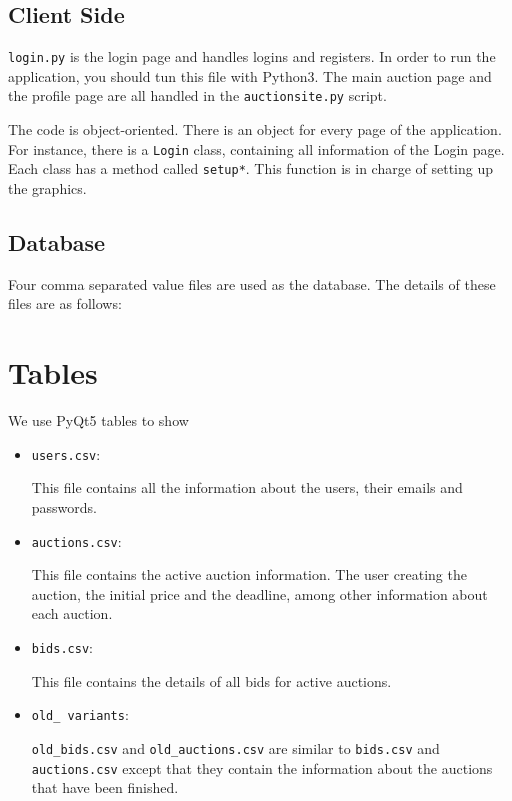\documentclass{article}
\begin{document}
\subsection{Client Side}

\texttt{login.py} is the login page and handles logins and registers. In order to run the application, you should tun this file with Python3. The main auction page and the profile page are all handled in the 
\texttt{auctionsite.py} script.

The code is object-oriented. There is an object for every page of the application. For instance, there is a \texttt{Login} class, containing all information of the Login page. Each class has a method called \texttt{setup*}. This function is in charge of setting up the graphics.

\subsection{Database}
Four comma separated value files are used as the database. The details of these files are as follows:

\section{Tables}

We use PyQt5 tables to show


\begin{itemize}
\item
\texttt{users.csv}:

This file contains all the information about the users, their emails and passwords.

\item 
\texttt{auctions.csv}:

This file contains the active auction information. The user creating the auction, the initial price and the deadline, among other information about each auction.

\item 
\texttt{bids.csv}:

This file contains the details of all bids for active auctions.


\item 
\texttt{old\_ variants}:

\texttt{old\_bids.csv} and \texttt{old\_auctions.csv}
are similar to \texttt{bids.csv} and \texttt{auctions.csv} except that they contain the information about the auctions that have been finished.
\end{itemize}
\end{document}

